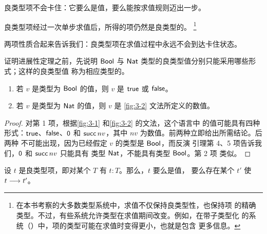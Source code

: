 \begin{description}[style=nextline,leftmargin=2em]
  \item[进展性] 良类型项不会卡住：它要么是值，要么能按求值规则迈出一步。
  \item[保持性] 良类型项经过一次单步求值后，所得的项仍然是良类型的。
    \footnote{在本书考察的大多数类型系统中，求值不仅保持良类型性，也保持项
    的精确类型。不过，有些系统允许类型在求值期间改变。例如，在带子类型化
    的系统（）中，项的类型可能在求值时变得更小，也就是包含
    更多信息。}
\end{description}

两项性质合起来告诉我们：良类型项在求值过程中永远不会到达卡住状态。

证明进展性定理之前，先说明 \(\mathsf{Bool}\) 与
\(\mathsf{Nat}\) 类型的良类型值分别只能采用哪些形式；这样的良类型值
称为相应类型的。

\taplstatementliststart
\begin{lemma}[典范形式]
\label{lem:8.3.1}
\taplstatementlistbreak
\begin{enumerate}
  \item 若 \(v\) 是类型为 \(\mathsf{Bool}\) 的值，则 \(v\) 是
    \(\mathsf{true}\) 或 \(\mathsf{false}\)。
  \item 若 \(v\) 是类型为 \(\mathsf{Nat}\) 的值，则 \(v\) 是
    \cref{fig:3-2} 文法所定义的数值。
\end{enumerate}
\end{lemma}

\begin{proof}
对第 1 项，根据\cref{fig:3-1} 和\cref{fig:3-2} 的文法，这个语言中
的值可能具有四种形式：\(\mathsf{true}\)、\(\mathsf{false}\)、\(\mathsf{0}\) 和
\(\mathsf{succ}\,nv\)，其中 \(nv\) 为数值。前两种立即给出所需结论。后两种
不可能出现，因为已经假定 \(v\) 的类型是 \(\mathsf{Bool}\)，而反演
引理第 4、5 项告诉我们，\(\mathsf{0}\) 和 \(\mathsf{succ}\,nv\) 只能具有
类型 \(\mathsf{Nat}\)，不能具有类型 \(\mathsf{Bool}\)。第 2 项
类似。
\end{proof}

\begin{theorem}[进展性]
\label{thm:8.3.2}
设 \(t\) 是良类型项，即对某个 \(T\) 有 \(t:T\)。那么，\(t\) 要么是值，
要么存在某个 \(t'\) 使 \(t\mathrel{\longrightarrow} t'\)。
\end{theorem}

